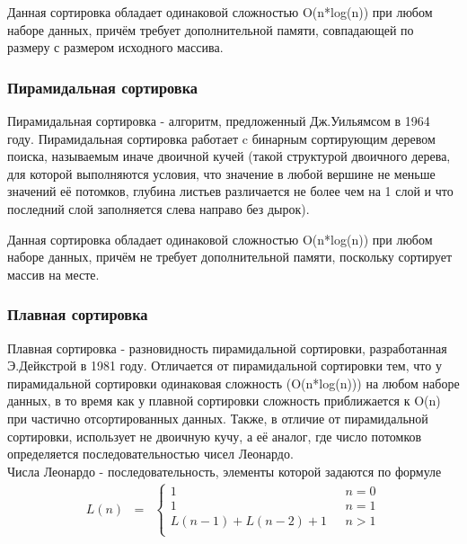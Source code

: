 \documentclass[12pt,a4paper]{scrartcl}
\begin{document}
			Данная сортировка обладает одинаковой сложностью O(n*log(n)) при любом наборе данных, причём требует дополнительной памяти, совпадающей по размеру с размером исходного массива. \cite{Beg}

		\subsubsection{Пирамидальная сортировка}

			Пирамидальная сортировка - алгоритм, предложенный Дж.Уильямсом в 1964 году. Пирамидальная сортировка работает c бинарным сортирующим деревом поиска, называемым иначе двоичной кучей (такой структурой двоичного дерева, для которой выполняются условия, что значение в любой вершине не меньше значений её потомков, глубина листьев различается не более чем на 1 слой и что последний слой заполняется слева направо без дырок). \cite{Alg}
			
			Данная сортировка обладает одинаковой сложностью O(n*log(n)) при любом наборе данных, причём не требует дополнительной памяти, поскольку сортирует массив на месте. \cite{Alg}

		\subsubsection{Плавная сортировка}

			Плавная сортировка - разновидность пирамидальной сортировки, разработанная Э.Дейкстрой в 1981 году. Отличается от пирамидальной сортировки тем, что у пирамидальной сортировки одинаковая сложность (O(n*log(n))) на любом наборе данных, в то время как у плавной сортировки сложность приближается к O(n) при частично отсортированных данных. Также, в отличие от пирамидальной сортировки, использует не двоичную кучу, а её аналог, где число потомков определяется последовательностью чисел Леонардо. \cite{SmS} \\

			Числа Леонардо - последовательность, элементы которой задаются по формуле \cite{Smooth} \\
			\begin{equation}\label{eq1.1}
				\begin{matrix}
					L(n) & = 
					& \left\{
					\begin{matrix}
						1 & \mbox{ } n = 0 \\
						1 & \mbox{ } n = 1 \\
						L(n-1)+L(n-2)+1 & \mbox{ } n > 1 \\
					\end{matrix} \right.
				\end{matrix}
			\end{equation}
			
\end{document}
